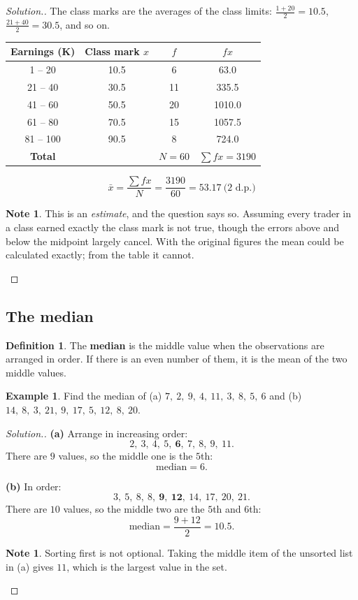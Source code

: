 \documentclass[11pt,a4paper]{article}
\theoremstyle{definition}
\newtheorem{definition}[thm]{Definition}
\newtheorem{example}[thm]{Example}
\newtheorem{note}[thm]{Note}
\newenvironment{solution}
  {\renewcommand{\qedsymbol}{}\begin{proof}[\textit{Solution}.]}
  {\end{proof}}
\begin{document}
\begin{solution}
The class marks are the averages of the class limits: $\frac{1+20}{2}=10.5$,
$\frac{21+40}{2}=30.5$, and so on.

\begin{table}[H]
\centering
\begin{tabular}{|c|c|c|c|}
\hline
Earnings (K) & Class mark $x$ & $f$ & $fx$\\
\hline
1 -- 20 & 10.5 & 6 & 63.0\\
21 -- 40 & 30.5 & 11 & 335.5\\
41 -- 60 & 50.5 & 20 & 1010.0\\
61 -- 80 & 70.5 & 15 & 1057.5\\
81 -- 100 & 90.5 & 8 & 724.0\\
\hline
\textbf{Total} & & $N=60$ & $\sum fx=3190$\\
\hline
\end{tabular}
\end{table}

$$\bar{x}=\frac{\sum fx}{N}=\frac{3190}{60}=53.17\ \text{(2 d.p.)}$$

\begin{note}
This is an \emph{estimate}, and the question says so. Assuming every trader in a class
earned exactly the class mark is not true, though the errors above and below the
midpoint largely cancel. With the original figures the mean could be calculated exactly;
from the table it cannot.
\end{note}
\end{solution}

\subsection{The median}

\begin{definition}
The \textbf{median} is the middle value when the observations are arranged in order. If
there is an even number of them, it is the mean of the two middle values.
\end{definition}

\begin{example}
Find the median of \quad (a) $7,\ 2,\ 9,\ 4,\ 11,\ 3,\ 8,\ 5,\ 6$ \quad and \quad
(b) $14,\ 8,\ 3,\ 21,\ 9,\ 17,\ 5,\ 12,\ 8,\ 20$.
\end{example}

\begin{solution}
\textbf{(a)} Arrange in increasing order:
$$2,\ 3,\ 4,\ 5,\ \mathbf{6},\ 7,\ 8,\ 9,\ 11.$$
There are $9$ values, so the middle one is the $5$th:
$$\text{median}=6.$$

\textbf{(b)} In order:
$$3,\ 5,\ 8,\ 8,\ \mathbf{9},\ \mathbf{12},\ 14,\ 17,\ 20,\ 21.$$
There are $10$ values, so the middle two are the $5$th and $6$th:
$$\text{median}=\frac{9+12}{2}=10.5.$$

\begin{note}
Sorting first is not optional. Taking the middle item of the unsorted list in (a) gives
$11$, which is the largest value in the set.
\end{note}
\end{solution}
\end{document}

